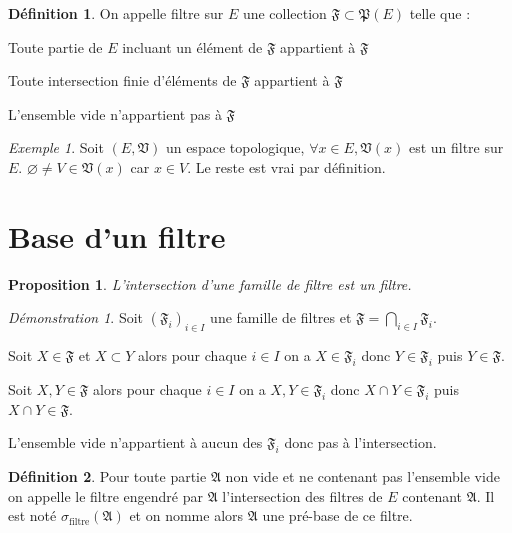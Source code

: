 \documentclass[a4paper, 11pt, french]{book}
\newenvironment{itemise}{\itemize}{\enditemize}
\theoremstyle{plain} %
\newtheorem{proposition}{Proposition}
\theoremstyle{definition} %
\newtheorem{definition}{Définition}
\theoremstyle{remark} %
\newtheorem{exemple}{Exemple}
\newtheorem*{demonstration}{Démonstration}
\newcommand{\1}{\mathds{1}}
\newcommand\vide{\varnothing}
\renewcommand{\frak}[1]{\mathfrak{#1}}
\renewcommand{\rm}[1]{\mathrm{#1}}
\begin{document}
\begin{definition}
	On appelle filtre sur $E$ une collection $\frak{F}\subset\frak{P}(E)$ telle que :
	\begin{itemise}
		\item Toute partie de $E$ incluant un élément de $\frak{F}$ appartient à $\frak{F}$
		\item Toute intersection finie d'éléments de $\frak{F}$ appartient à $\frak{F}$
		\item L'ensemble vide n'appartient pas à $\frak{F}$
	\end{itemise}
\end{definition}

\begin{exemple}
	Soit $(E, \frak{V})$ un espace topologique, $\forall x\in E, \frak{V}(x)$ est un filtre sur $E$.
	$\vide\neq V\in\frak{V}(x)$ car $x\in V$.
	Le reste est vrai par définition.
\end{exemple}

\section{Base d'un filtre}

\begin{proposition}
	L'intersection d'une famille de filtre est un filtre.
\end{proposition}

\begin{demonstration}
	Soit $(\frak{F}_i)_{i\in I}$ une famille de filtres et $\frak{F}=\bigcap_{i\in I}\frak{F}_i$.
	\begin{itemise}
		\item Soit $X\in\frak{F}$ et $X\subset Y$ alors pour chaque $i\in I$ on a $X\in\frak{F}_i$ donc $Y\in\frak{F}_i$ puis $Y\in\frak{F}$.
		\item Soit $X, Y\in\frak{F}$ alors pour chaque $i\in I$ on a $X, Y\in\frak{F}_i$ donc $X\cap Y\in\frak{F}_i$ puis $X\cap Y\in\frak{F}$.
		\item L'ensemble vide n'appartient à aucun des $\frak{F}_i$ donc pas à l'intersection.
	\end{itemise}
\end{demonstration}

\begin{definition}
	Pour toute partie $\frak{A}$ non vide et ne contenant pas l'ensemble vide on appelle le filtre engendré par $\frak{A}$ l'intersection des filtres de $E$ contenant $\frak{A}$.
	Il est noté $\sigma_\rm{filtre}(\frak{A})$ et on nomme alors $\frak{A}$ une pré-base de ce filtre.
\end{definition}
\end{document}
